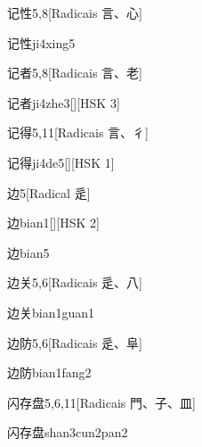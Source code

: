 \begin{entry}{记性}{5,8}[Radicais ⾔、⼼]
  \begin{phonetics}{记性}{ji4xing5}
  \end{phonetics}
\end{entry}

\begin{entry}{记者}{5,8}[Radicais ⾔、⽼]
  \begin{phonetics}{记者}{ji4zhe3}[][HSK 3]
  \end{phonetics}
\end{entry}

\begin{entry}{记得}{5,11}[Radicais ⾔、⼻]
  \begin{phonetics}{记得}{ji4de5}[][HSK 1]
  \end{phonetics}
\end{entry}

\begin{entry}{边}{5}[Radical ⾡]
  \begin{phonetics}{边}{bian1}[][HSK 2]
  \end{phonetics}
  \begin{phonetics}{边}{bian5}
  \end{phonetics}
\end{entry}

\begin{entry}{边关}{5,6}[Radicais ⾡、⼋]
  \begin{phonetics}{边关}{bian1guan1}
  \end{phonetics}
\end{entry}

\begin{entry}{边防}{5,6}[Radicais ⾡、⾩]
  \begin{phonetics}{边防}{bian1fang2}
  \end{phonetics}
\end{entry}

\begin{entry}{闪存盘}{5,6,11}[Radicais ⾨、⼦、⽫]
  \begin{phonetics}{闪存盘}{shan3cun2pan2}
  \end{phonetics}
\end{entry}

